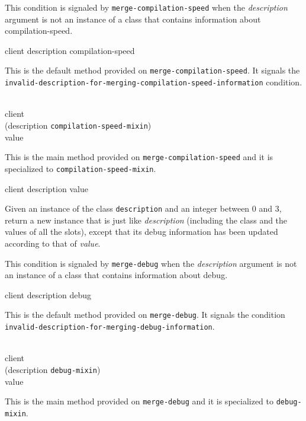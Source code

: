 {\footnotesize
{}
}

This condition is signaled by \texttt{merge-compilation-speed} when the
\textit{description} argument is not an instance of a class that
contains information about compilation-speed.

{\footnotesize
{} {client description compilation-speed}
}

This is the default method provided on \texttt{merge-compilation-speed}.  It
signals the
\texttt{invalid-description-for-merging-compilation-speed-information}
condition.

{\footnotesize
{}\\
           {client\\
            (description {\tt compilation-speed-mixin})\\
            value}
}

This is the main method provided on
\texttt{merge-compilation-speed} and it is specialized to
\texttt{compilation-speed-mixin}.

{\footnotesize
{} {client description value}
}

Given an instance of the class \texttt{description} and an
integer between $0$ and $3$, return a new instance that is just like
\textit{description} (including the class and the values of
all the slots), except that its debug information has been updated
according to that of \textit{value}.

{\footnotesize
{}
}

This condition is signaled by \texttt{merge-debug} when the
\textit{description} argument is not an instance of a class that
contains information about debug.

{\footnotesize
{} {client description debug}
}

This is the default method provided on \texttt{merge-debug}.  It
signals the condition
\texttt{invalid-description-for-merging-debug-information}.

{\footnotesize
{}\\
           {client\\
            (description {\tt debug-mixin})\\
            value}
}

This is the main method provided on \texttt{merge-debug} and it is
specialized to \texttt{debug-mixin}.

